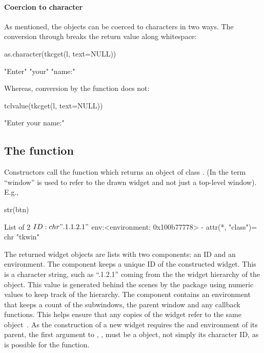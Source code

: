 \paragraph{Coercion to character}
As mentioned, the  objects can be coerced to characters in two ways.
The conversion through  breaks the return value along whitespace:
\begin{Schunk}
\begin{Sinput}
 as.character(tkcget(l, text=NULL))
\end{Sinput}
\begin{Soutput}
[1] "Enter" "your"  "name:"
\end{Soutput}
\end{Schunk}
%
Whereas, conversion by the  function does not:
\begin{Schunk}
\begin{Sinput}
 tclvalue(tkcget(l, text=NULL))
\end{Sinput}
\begin{Soutput}
[1] "Enter your name:"
\end{Soutput}
\end{Schunk}
%

\subsection{The  function}
\label{sec:codetkw-funct}


Constructors call the  function which returns an
object of class . (In \TK\/ the term ``window'' is used to
refer to the drawn widget and not just a top-level window). E.g.,

\begin{Schunk}
\begin{Sinput}
 str(btn)
\end{Sinput}
\begin{Soutput}
List of 2
 $ ID : chr ".1.1.2.1"
 $ env:<environment: 0x100b77778> 
 - attr(*, "class")= chr "tkwin"
\end{Soutput}
\end{Schunk}

The returned widget objects are lists with two components: an ID and an
environment. The  component keeps a unique ID of the
constructed widget. This is a character string, such as ``.1.2.1''
coming from the the widget hierarchy of the object. This value is
generated behind the scenes by the  package using numeric
values to keep track of the hierarchy. The  component
contains an environment that keeps a count of the subwindows, the parent
window and any callback functions. This helps ensure that any copies
of the widget refer to the same object~\citep{Dalgaard-DSC}. As the
construction of a new widget requires the  and environment of
its parent, the first argument to , ,
must be a  object, not simply its character ID, as is
possible for the  function.

